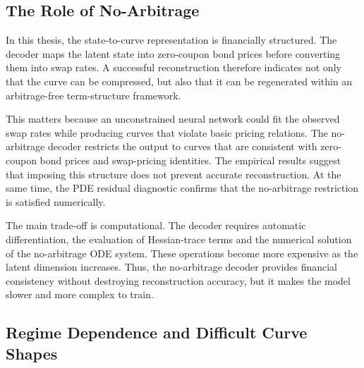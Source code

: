 \subsection{The Role of No-Arbitrage}

In this thesis, the state-to-curve representation is financially structured. The decoder maps the latent state into zero-coupon bond prices before converting them into swap rates. A successful reconstruction therefore indicates not only that the curve can be compressed, but also that it can be regenerated within an arbitrage-free term-structure framework.

This matters because an unconstrained neural network could fit the observed swap rates while producing curves that violate basic pricing relations. The no-arbitrage decoder restricts the output to curves that are consistent with zero-coupon bond prices and swap-pricing identities. The empirical results suggest that imposing this structure does not prevent accurate reconstruction. At the same time, the PDE residual diagnostic confirms that the no-arbitrage restriction is satisfied numerically.

The main trade-off is computational. The decoder requires automatic differentiation, the evaluation of Hessian-trace terms and the numerical solution of the no-arbitrage ODE system. These operations become more expensive as the latent dimension increases. Thus, the no-arbitrage decoder provides financial consistency without destroying reconstruction accuracy, but it makes the model slower and more complex to train.

\subsection{Regime Dependence and Difficult Curve Shapes}

